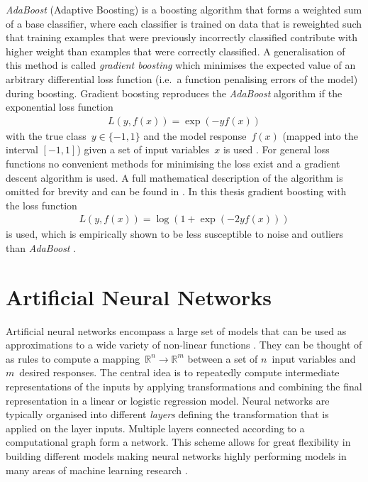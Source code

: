 \emph{AdaBoost} (Adaptive Boosting) is a boosting algorithm that forms a
weighted sum of a base classifier, where each classifier is trained on data that
is reweighted such that training examples that were previously incorrectly
classified contribute with higher weight than examples that were correctly
classified. A generalisation of this method is called \emph{gradient boosting}
which minimises the expected value of an arbitrary differential loss function
(i.e.\ a function penalising errors of the model) during boosting. Gradient
boosting reproduces the \emph{AdaBoost} algorithm if the exponential loss
function
\begin{align*}
  L\left(y, f(x)\right) = \exp\left(- y f(x)\right)
\end{align*}
with the true class~$y \in \{ -1, 1 \}$ and the model response~$f(x)$ (mapped
into the interval $[-1, 1]$) given a set of input variables~$x$ is used
\cite{esl}. For general loss functions no convenient methods for minimising the
loss exist and a gradient descent algorithm is used. A full mathematical
description of the algorithm is omitted for brevity and can be found in
\cite{friedman_gbm, esl}. In this thesis gradient boosting with the loss
function
\begin{align*}
  L\left(y, f(x)\right) = \log\left( 1 + \exp(- 2 y f(x)) \right)
\end{align*}
is used, which is empirically shown to be less susceptible to noise and outliers
than \emph{AdaBoost} \cite{esl, schapire_boosting}.

\section{Artificial Neural Networks}
\label{sec:nn}

Artificial neural networks encompass a large set of models that can be used as
approximations to a wide variety of non-linear functions \cite{hornik}. They can
be thought of as rules to compute a
mapping~\mbox{$\mathbb{R}^n \rightarrow \mathbb{R}^m$} between a set of
$n$~input variables and $m$~desired responses. The central idea is to repeatedly
compute intermediate representations of the inputs by applying transformations
and combining the final representation in a linear or logistic regression model.
Neural networks are typically organised into different \emph{layers} defining
the transformation that is applied on the layer inputs. Multiple layers
connected according to a computational graph form a network. This scheme allows
for great flexibility in building different models making neural networks highly
performing models in many areas of machine learning research .

